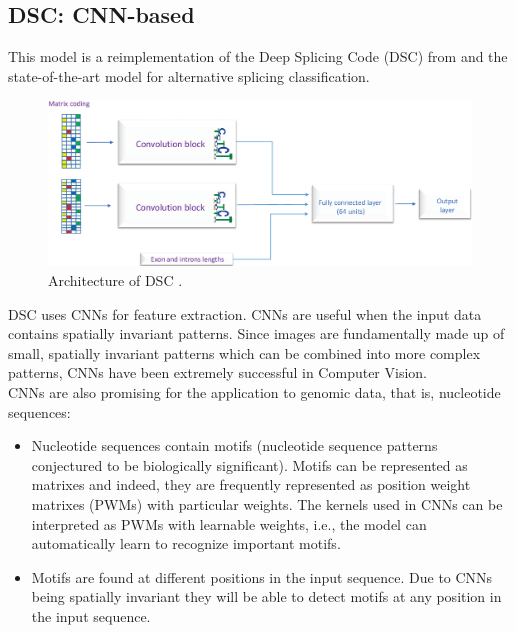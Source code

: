\subsection{DSC: CNN-based} \label{subsec:dsc}
This model is a reimplementation of the Deep Splicing Code (DSC) from \cite{dsc} and the state-of-the-art model for alternative splicing classification. 

\begin{figure}
	\centering\includegraphics[width=1\textwidth]{../visualizations/ch4-methods/dsc_architecture.png} 
	\caption{
		Architecture of DSC \cite{dsc}. 
	}
	\label{fig:dsc_architecture}
\end{figure}
DSC uses CNNs for feature extraction. 
CNNs are useful when the input data contains spatially invariant patterns.  Since images are fundamentally made up of small, spatially invariant patterns which can be combined into more complex patterns, CNNs have been extremely successful in Computer Vision.\\
CNNs are also promising for the application to genomic data, that is, nucleotide sequences: 
\begin{itemize}
	\item Nucleotide sequences contain motifs (nucleotide sequence patterns conjectured to be biologically significant). Motifs can be represented as matrixes and indeed, they are frequently represented as position weight matrixes (PWMs) with particular weights. The kernels used in CNNs can be interpreted as PWMs with learnable weights, i.e., the model can automatically learn to recognize important motifs. %
	\item Motifs are found at different positions in the input sequence. Due to CNNs being spatially invariant they will be able to detect motifs at any position in the input sequence.
\end{itemize}

